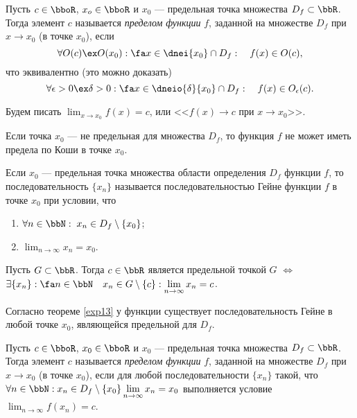 \begin{defn}\label{exp12} 
Пусть $c\in\bboR$, $x_o \in \bboR$ и $x_0$ --- предельная точка множества $D_f \subset \bbR$. Тогда элемент $c$ называется \textit{пределом функции} $f$, заданной на множестве $D_f$ при $x \to x_0$ (в точке $x_0$), если
$$
\forall O(c) \ex O(x_0): \fa x \in \dnei{x_0}\cap D_f:\quad f(x) \in O(c),
$$  
что эквивалентно (это можно доказать)
$$
\forall \epsilon > 0 \ex \delta >0: \fa x \in \dneio{\delta}{x_0} \cap D_f:\quad f(x) \in O_\epsilon (c). 
$$

Будем писать $\lim_{x \to x_0}\limits f(x) = c$, или <<$f(x)\to c$ при $x \to x_0$>>.
\end{defn}
Если точка $x_0$ --- не предельная для множества $D_f$, то функция $f$ не может иметь предела по Коши в точке $x_0$. %

\begin{defn}
Если $x_0$ --- предельная точка множества области определения $D_f$ функции $f$, то последовательность $\{x_n\}$ называется последовательностью Гейне функции $f$ в точке $x_0$ при условии, что
\begin{enumerate}
\item $\forall n \in \bbN:\; x_n\in D_f\setminus \{x_0\}$;
\item $\lim_{n \to \infty}\limits x_n = x_0$.
\end{enumerate}
\end{defn}

\begin{thm}
\label{exp13}
Пусть $G \subset \bbR$. Тогда $c \in \bbR$ является предельной точкой $G$ $\Longleftrightarrow$ $ \exists \{x_n\}: \fa n \in \bbN \quad x_n \in G\setminus\{c\}: \lim_{n \to \infty}\limits x_n = c$. 
\end{thm}

Согласно теореме \ref{exp13} у функции существует последовательность Гейне в любой точке $x_0$, являющейся предельной для $D_f$.

\begin{defn}\label{exp11} 
Пусть $c\in\bboR$, $x_0 \in \bboR$ и $x_0$ --- предельная точка множества $D_f \subset \bbR$. Тогда элемент $c$ называется \textit{пределом функции} $f$, заданной на множестве $D_f$ при $x \to x_0$ (в точке $x_0$), если для любой последовательности $\{x_n\}$ такой, что $\forall n \in \bbN: x_n\in D_f\setminus \{x_0\} \lim_{n \to \infty}\limits x_n = x_0$ выполняется условие $\lim_{n \to \infty}\limits f(x_n) = c$. 
\end{defn}

